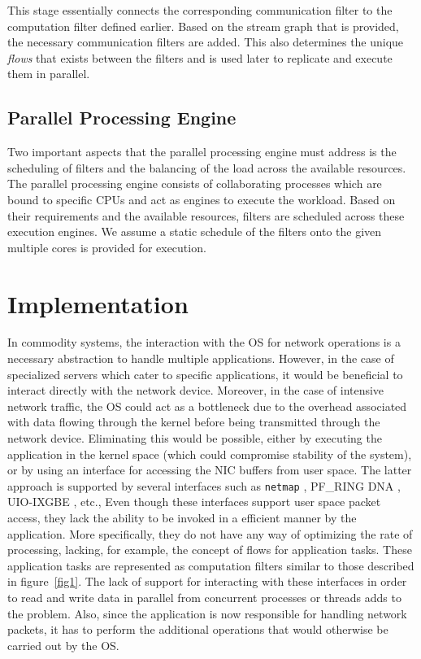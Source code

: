 \documentclass[10pt, conference, compsocconf, reqno]{IEEEtran}
\newcommand{\comment}[1]{}
\begin{document}
This stage essentially connects the corresponding communication filter to the computation filter defined earlier. Based on the stream graph that is provided, the necessary communication filters are added. This also determines the unique \textit{flows} that exists between the filters and is used later to replicate and execute them in parallel.

\subsection{Parallel Processing Engine}

Two important aspects that the parallel processing engine must address is the scheduling of filters and the balancing of the load across the available resources. The parallel processing engine consists of collaborating processes which are bound to specific CPUs and act as engines to execute the workload. Based on their requirements and the available resources, filters are scheduled across these execution engines. We assume a static schedule of the filters onto the given multiple cores is provided for execution. \comment{In this manner, the workload can be distributed flexibly.}

\section{Implementation}
\label{imple}

\comment{Most extant stream applications depend on the OS for their communication tasks.}In commodity systems, the interaction with the OS for network operations is a necessary abstraction to handle multiple applications. However, in the case of specialized servers which cater to specific applications, it would be beneficial to interact directly with the network device. Moreover, in the case of intensive network traffic, the OS could act as a bottleneck due to the overhead associated with data flowing through the kernel before being transmitted through the network device\cite{Wu:2007:PPB:1323954.1323957}\cite{Wu:2007:PAL:1227865.1228021}. Eliminating this would be possible, either by executing the application in the kernel space (which could compromise stability of the system), or by using an interface for accessing the NIC buffers from user space. The latter approach is supported by several interfaces such as \texttt{netmap} \cite{Rizzo:2012:RNI:2090147.2103536}, PF\_RING DNA \cite{1564468}, UIO-IXGBE \cite{Krasnyansky}, etc., Even though these interfaces support user space packet access, they lack the ability to be invoked in a efficient manner by the application. More specifically, they do not have any way of optimizing the rate of processing, lacking, for example, the concept of flows for application tasks. These application tasks are represented as computation filters similar to those described in figure~\ref{fig1}. The lack of support for interacting with these interfaces in order to read and write data in parallel from concurrent processes or threads adds to the problem. Also, since the application is now responsible for handling network packets, it has to perform the additional operations that would otherwise be carried out by the OS.
\end{document}
